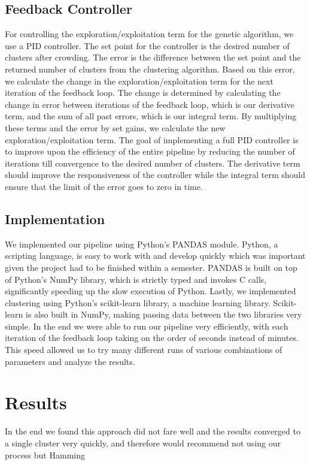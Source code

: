 \documentclass{sig-alternate}
\begin{document}
\subsection{Feedback Controller}
For controlling the exploration/exploitation term for the genetic algorithm, we use a PID controller. The set point for the controller is the desired number of clusters after crowding. The error is the difference between the set point and the returned number of clusters from the clustering algorithm. Based on this error, we calculate the change in the exploration/exploitation term for the next iteration of the feedback loop. The change is determined by calculating the change in error between iterations of the feedback loop, which is our derivative term, and the sum of all past errors, which is our integral term. By multiplying these terms and the error by set gains, we calculate the new exploration/exploitation term. The goal of implementing a full PID controller is to improve upon the efficiency of the entire pipeline by reducing the number of iterations till convergence to the desired number of clusters. The derivative term should improve the responsiveness of the controller while the integral term should ensure that the limit of the error goes to zero in time.

\subsection{Implementation}
We implemented our pipeline using Python's PANDAS module. Python, a scripting language, is easy to work with and develop quickly which was important given the project had to be finished within a semester. PANDAS is built on top of Python's NumPy library, which is strictly typed and invokes C calls, significantly speeding up the slow execution of Python. Lastly, we implemented clustering using Python's scikit-learn library, a machine learning library. Scikit-learn is also built in NumPy, making passing data between the two libraries very simple. In the end we were able to run our pipeline very efficiently, with each iteration of the feedback loop taking on the order of seconds instead of minutes. This speed allowed us to try many different runs of various combinations of parameters and analyze the results.

\section{Results}
In the end we found this approach did not fare well and the results converged to a single cluster very quickly, and therefore would recommend not using our process but Hamming
\end{document}

